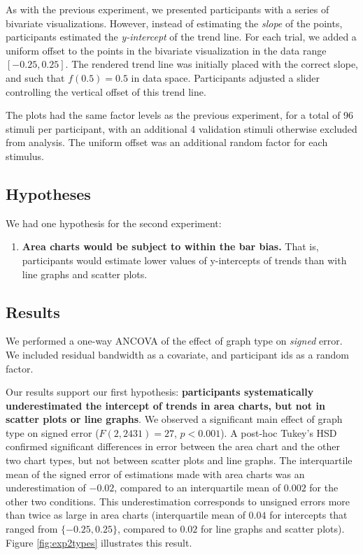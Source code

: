\documentclass{sigchi}
\begin{document}
As with the previous experiment, we presented participants with a series of bivariate visualizations. However, instead of estimating the \emph{slope} of the points, participants estimated the \emph{y-intercept} of the trend line. For each trial, we added a uniform offset to the points in the bivariate visualization in the data range $[-0.25,0.25]$. The rendered trend line was initially placed with the correct slope, and such that $f(0.5)=0.5$ in data space. Participants adjusted a slider controlling the vertical offset of this trend line.

The plots had the same factor levels as the previous experiment, for a total of 96 stimuli per participant, with an additional 4 validation stimuli otherwise excluded from analysis. The uniform offset was an additional random factor for each stimulus.

\subsection{Hypotheses}

We had one hypothesis for the second experiment:
\begin{enumerate}
	\item \textbf{Area charts would be subject to within the bar bias.} That is, participants would estimate lower values of y-intercepts of trends than with line graphs and scatter plots.
\end{enumerate}

\subsection{Results}
We performed a one-way ANCOVA of the effect of graph type on \emph{signed} error. We included residual bandwidth as a covariate, and participant ids as a random factor.

Our results support our first hypothesis: \textbf{participants systematically underestimated the intercept of trends in area charts, but not in scatter plots or line graphs}. We observed a significant main effect of graph type on signed error ($F(2,2431)=27$, $p<0.001$). A post-hoc Tukey's HSD confirmed significant differences in error between the area chart and the other two chart types, but not between scatter plots and line graphs. The interquartile mean of the signed error of estimations made with area charts was an underestimation of $-0.02$, compared to an interquartile mean of $0.002$ for the other two conditions. This underestimation corresponds to unsigned errors more than twice as large in area charts (interquartile mean of $0.04$ for intercepts that ranged from $\{-0.25,0.25\}$, compared to $0.02$ for line graphs and scatter plots). Figure \ref{fig:exp2types} illustrates this result.
\end{document}
